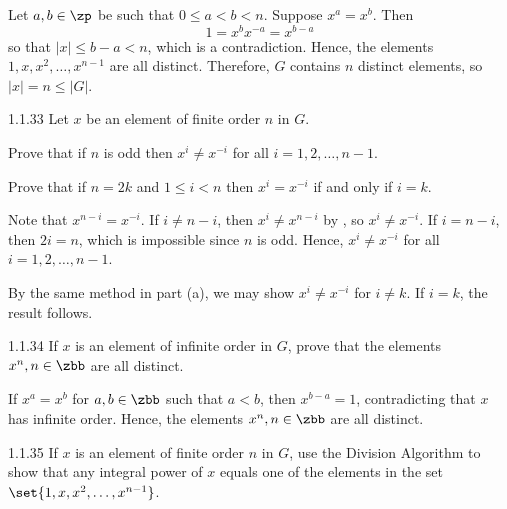 \begin{sol}
    Let $a, b \in \zp$ be such that $0 \leq a < b < n$.
	Suppose $x^a = x^b$.
	Then
    \[
    	1 = x^b x^{-a} = x^{b - a}
    \]
    so that $|x| \leq b - a < n$, which is a contradiction.
	Hence, the elements $1, x, x^2, \dots, x^{n-1}$ are all distinct.
	Therefore, $G$ contains $n$ distinct elements, so $|x| = n \leq |G|$.
\end{sol}

\begin{exercise}{1.1.33}
    Let $x$ be an element of finite order $n$ in $G$.
    \begin{subexercises}
        \item Prove that if $n$ is odd then $x^i \neq x^{-i}$ for all $i = 1, 2, \dots, n-1$.
        \item Prove that if $n = 2k$ and $1 \leq i < n$ then $x^i = x^{-i}$ if and only if $i = k$.
    \end{subexercises}
\end{exercise}

\begin{solenum}
    \item Note that $x^{n - i} = x^{-i}$.
	If $i \neq n - i$, then $x^i \neq x^{n - i}$ by , so $x^i \neq x^{-i}$.
	If $i = n - i$, then $2i = n$, which is impossible since $n$ is odd.
	Hence, $x^i \neq x^{-i}$ for all $i = 1, 2, \dots, n-1$.
    \item By the same method in part (a), we may show $x^i \neq x^{-i}$ for $i \neq k$.
	If $i = k$, the result follows.
\end{solenum}

\begin{exercise}{1.1.34}
    If $x$ is an element of infinite order in $G$, prove that the elements $x^n, n \in \zbb$ are all distinct.
\end{exercise}

\begin{sol}
    If $x^a = x^b$ for $a, b \in \zbb$ such that $a < b$, then $x^{b - a} = 1$, contradicting that $x$ has infinite order.
	Hence, the elements $x^n, n \in \zbb$ are all distinct.
\end{sol}

\begin{exercise}{1.1.35}
    If $x$ is an element of finite order $n$ in $G$, use the Division Algorithm to show that any integral power of $x$ equals one of the elements in the set $\set{1, x, x^2, \dots, x^{n-1}}$.
    
\end{exercise}

